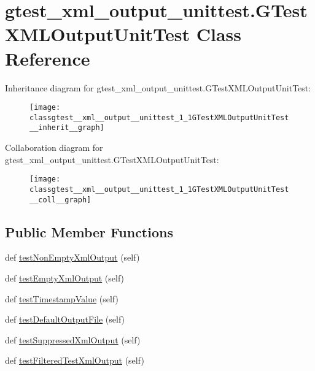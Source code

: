 \hypertarget{classgtest__xml__output__unittest_1_1GTestXMLOutputUnitTest}{}\section{gtest\+\_\+xml\+\_\+output\+\_\+unittest.\+G\+Test\+X\+M\+L\+Output\+Unit\+Test Class Reference}
\label{classgtest__xml__output__unittest_1_1GTestXMLOutputUnitTest}


Inheritance diagram for gtest\+\_\+xml\+\_\+output\+\_\+unittest.\+G\+Test\+X\+M\+L\+Output\+Unit\+Test\+:\nopagebreak
\begin{figure}[H]
\begin{center}
\leavevmode
\texttt{[image: classgtest\_\_xml\_\_output\_\_unittest\_1\_1GTestXMLOutputUnitTest\_\_inherit\_\_graph]}
\end{center}
\end{figure}


Collaboration diagram for gtest\+\_\+xml\+\_\+output\+\_\+unittest.\+G\+Test\+X\+M\+L\+Output\+Unit\+Test\+:\nopagebreak
\begin{figure}[H]
\begin{center}
\leavevmode
\texttt{[image: classgtest\_\_xml\_\_output\_\_unittest\_1\_1GTestXMLOutputUnitTest\_\_coll\_\_graph]}
\end{center}
\end{figure}
\subsection*{Public Member Functions}
\begin{DoxyCompactItemize}
\item 
def \hyperlink{classgtest__xml__output__unittest_1_1GTestXMLOutputUnitTest_a310c136c1eb2b421f57651a7d358b17a}{test\+Non\+Empty\+Xml\+Output} (self)
\item 
def \hyperlink{classgtest__xml__output__unittest_1_1GTestXMLOutputUnitTest_a9602f91fe2e9d1e09171a032e94a5619}{test\+Empty\+Xml\+Output} (self)
\item 
def \hyperlink{classgtest__xml__output__unittest_1_1GTestXMLOutputUnitTest_a828521a7ae57f650e1e9ca4beb34336a}{test\+Timestamp\+Value} (self)
\item 
def \hyperlink{classgtest__xml__output__unittest_1_1GTestXMLOutputUnitTest_a01ca66e14468028e5c4eb809987113cf}{test\+Default\+Output\+File} (self)
\item 
def \hyperlink{classgtest__xml__output__unittest_1_1GTestXMLOutputUnitTest_ac6df46d6831892e4c14dbdfae0049618}{test\+Suppressed\+Xml\+Output} (self)
\item 
def \hyperlink{classgtest__xml__output__unittest_1_1GTestXMLOutputUnitTest_a572b6d49e8f4d646ebdadcced3d260ef}{test\+Filtered\+Test\+Xml\+Output} (self)
\end{DoxyCompactItemize}
